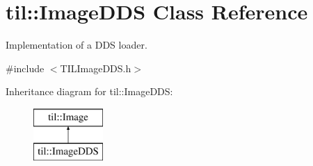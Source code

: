 \hypertarget{classtil_1_1_image_d_d_s}{
\section{til::ImageDDS Class Reference}
\label{classtil_1_1_image_d_d_s}
}


Implementation of a DDS loader.  




{\ttfamily \#include $<$TILImageDDS.h$>$}

Inheritance diagram for til::ImageDDS:\begin{figure}[H]
\begin{center}
\leavevmode
\includegraphics[height=2.000000cm]{classtil_1_1_image_d_d_s}
\end{center}
\end{figure}
